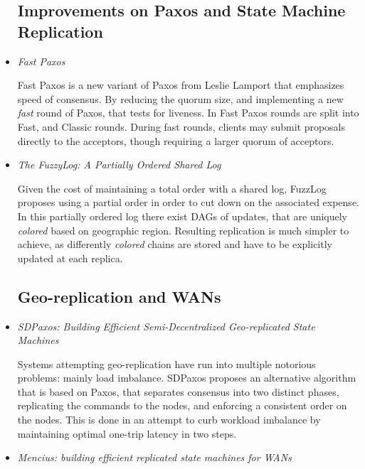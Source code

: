 \documentclass{article}
\begin{document}
\begin{itemize}

	\subsection{Improvements on Paxos and State Machine Replication}

	\item
	\textit{Fast Paxos} \cite{lamport2006fast}

	Fast Paxos is a new variant of Paxos from Leslie Lamport that emphasizes speed of consensus.
	By reducing the quorum size, and implementing a new \textit{fast} round of Paxos, that tests for liveness.
	In Fast Paxos rounds are split into Fast, and Classic rounds. During fast rounds, clients may submit proposals directly to the acceptors, though requiring a larger quorum of acceptors.

	\item
	\textit{The FuzzyLog: A Partially Ordered Shared Log} \cite{FuzzyLog}

	Given the cost of maintaining a total order with a shared log, FuzzLog proposes using a partial order in order to cut down on the associated expense.
	In this partially ordered log there exist DAGs of updates, that are uniquely \textit{colored} based on geographic region.
	Resulting replication is much simpler to achieve, as differently \textit{colored} chains are stored and have to be explicitly updated at each replica.


	\subsection{Geo-replication and WANs}

	\item
	\textit{SDPaxos: Building Efficient Semi-Decentralized Geo-replicated State Machines} \cite{zhao2018sdpaxos}

	Systems attempting geo-replication have run into multiple notorious problems: mainly load imbalance.
	SDPaxos proposes an alternative algorithm that is based on Paxos, that separates consensus into two distinct phases, replicating the commands to the nodes, and enforcing a consistent order on the nodes.
	This is done in an attempt to curb workload imbalance by maintaining optimal one-trip latency in two steps.

	\item
	\textit{Mencius: building efficient replicated state machines for WANs} \cite{Mencius}


\end{itemize}
\end{document}
